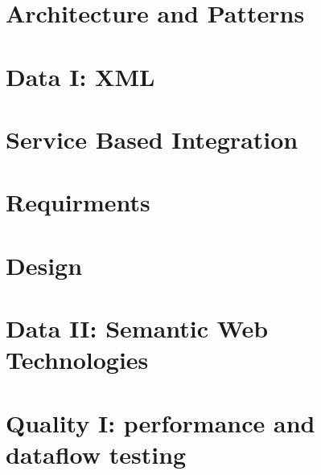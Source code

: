 
\pagestyle{custom}

\newcommand{\ind}[1]{}

\ind{FormaliaForside}
\clearpage %

\renewcommand{\ind}[1]{}
\chapter{Architecture and Patterns}
\ind{XMLStructure.tex}
\ind{MVC.tex}
\ind{mvcimpl.tex}
\ind{aboutModel.tex}
\ind{aboutView.tex}
\ind{aboutController}
\ind{implModel.tex}
\chapter{Data I: XML}
\ind{xmlImplemetation}
\ind{xtls}
\ind{xQuary}
\chapter{Service Based Integration}
\ind{webservices}

\ind{WebServiceSolution}
\ind{webserviceComparison}
\ind{apiimpl}
\chapter{Requirments}
\ind{requirements}
\chapter{Design}
\ind{designintro}
\ind{navigation}
\ind{presentation}
\ind{designreflection}
\chapter{Data II: Semantic Web Technologies}
\ind{rdf}
\ind{SPARQL}
\chapter{Quality I: performance and dataflow testing}
\ind{performancetest}
\ind{TestBottleneck}
\ind{cfg}
\ind{controlflowanalysis}
\ind{ProAndConOfDataFlowTEst}

